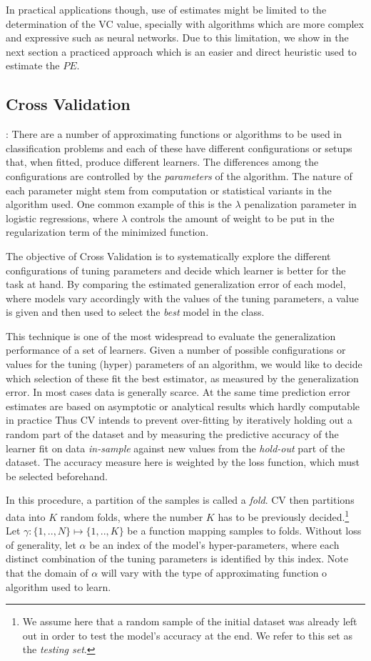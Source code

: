 In practical applications though, use of estimates might be limited to the determination of the VC value, specially with algorithms which are more complex and expressive such as neural networks. Due to this limitation, we show in the next section a practiced approach which is an easier and direct heuristic used to estimate the $PE$.


\subsection{Cross Validation}:
 There are a number of approximating functions or algorithms to be used in classification problems and each of these have different configurations or setups that, when fitted, produce different learners. The differences among the configurations are controlled by the \textit{parameters} of the algorithm. The nature of each parameter might stem from computation or statistical variants in the algorithm used. One common example of this is the $\lambda$ penalization parameter in logistic regressions, where $\lambda$ controls the amount of weight to be put in the regularization term of the minimized function.

The objective of Cross Validation is to systematically explore the different configurations of tuning parameters and decide which learner is better for the task at hand. By comparing the estimated generalization error of each model, where models vary accordingly with the values of the tuning parameters, a value is given and then used to select the \textit{best} model in the class.

This technique is one of the most widespread to evaluate the generalization performance of a set of learners. Given a number of possible configurations or values for the tuning (hyper) parameters of an algorithm, we would like to decide which selection of these fit the best estimator, as measured by the generalization error. In most cases data is generally scarce. At the same time prediction error estimates are based on asymptotic or analytical results which hardly computable in practice Thus CV intends to prevent over-fitting by iteratively holding out a random part of the dataset and by measuring the predictive accuracy of the learner fit on data \textit{in-sample} against new values from the \textit{hold-out} part of the dataset. The accuracy measure here is weighted by the loss function, which must be selected beforehand.

In this procedure, a partition of the samples is called a \textit{fold}. CV then partitions data into $K$ random folds, where the number $K$ has to be previously decided.\footnote{ We assume here that a random sample of the initial dataset was already left out in order to test the model's accuracy at the end. We refer to this set as the \textit{testing set}.} Let $\gamma : \{1,..,N\} \mapsto \{1, .., K\}$ be a function mapping samples to folds. Without loss of generality,  let $\alpha$ be an index of the model's hyper-parameters, where each distinct combination of the tuning parameters is identified by this index. Note that the domain of $\alpha$ will vary with the type of approximating function o algorithm used to learn.

